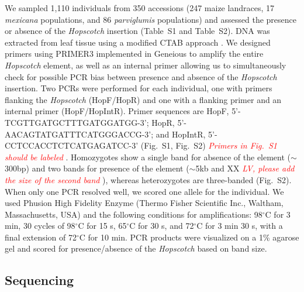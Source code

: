 \documentclass[11pt]{article}
\newcommand{\mbh}[1]{\textcolor{red}{ \emph{\scriptsize  #1}} }
\begin{document}
\begin{linenumbers}
\begin{flushleft}
We sampled 1,110 individuals from 350 accessions (247 maize landraces, 17 \emph{mexicana} populations, and 86 \emph{parviglumis} populations) and assessed the presence or absence of the \emph{Hopscotch} insertion (Table~S1 and Table~S2). DNA was extracted from leaf tissue using a modified CTAB approach \citep{DoyleDoyle1990, Maloof1984}. We designed primers using PRIMER3 \citep{RozenSkaletsky2000} implemented in Geneious \citep{Kearse2012} to amplify the entire \emph{Hopscotch} element, as well as an internal primer allowing us to simultaneously check for possible PCR bias between presence and absence of the \emph{Hopscotch} insertion. Two PCRs were performed for each individual, one with primers flanking the \emph{Hopscotch} (HopF/HopR) and one with a flanking primer and an internal primer (HopF/HopIntR). Primer sequences are HopF, {\small 5'-TCGTTGATGCTTTGATGGATGG-3'}; 
HopR, {\small 5'-AACAGTATGATTTCATGGGACCG-3'}; and HopIntR, {\small  5'-CCTCCACCTCTCATGAGATCC-3'} (Fig.~S1, Fig.~S2) \mbh{Primers in Fig.~S1 should be labeled}. Homozygotes show a single band for absence of the element ($\sim$300bp) and two bands for presence of the element ($\sim$5kb and XX \mbh{LV, please add the size of the second band}), whereas heterozygotes are three-banded (Fig.~S2). When only one PCR resolved well, we scored one allele for the individual. We used Phusion High Fidelity Enzyme (Thermo Fisher Scientific Inc., Waltham, Massachusetts, USA) and the following conditions for amplifications: 98$^{\circ}$C for 3 min, 30 cycles of 98$^{\circ}$C for 15 s, 65$^{\circ}$C for 30 s, and 72$^{\circ}$C for 3 min 30 s, with a final extension of 72$^{\circ}$C for 10 min. PCR products were visualized on a 1\% agarose gel and scored for presence/absence of the \emph{Hopscotch} based on band size.

\subsection*{Sequencing}


\end{flushleft}
\end{linenumbers}
\end{document}

